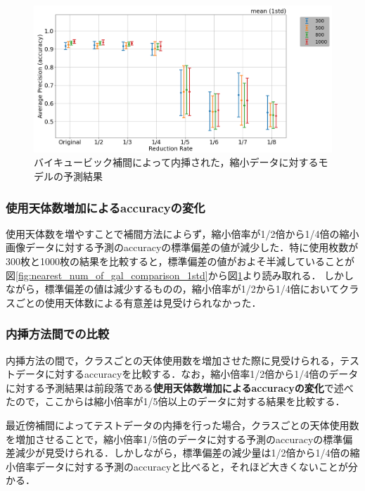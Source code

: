 \documentclass[a4j, 11pt]{jreport}
\begin{document}
\begin{figure}[H]
  \centering
  \includegraphics[width=1.0\hsize, keepaspectratio]{images/5syou/print_errorbar/cubic/acc_with_errorbar_syuron5_cubic_900epoch_30run_num_of_gal_comparison_acc_max_std1sigma.png}
  \caption{バイキュービック補間によって内挿された，縮小データに対するモデルの予測結果}
  \label{fig:cubic_num_of_gal_comparison_1std}
\end{figure}

\subsubsection{使用天体数増加によるaccuracyの変化}
使用天体数を増やすことで補間方法によらず，縮小倍率が1/2倍から1/4倍の縮小画像データに対する予測のaccuracyの標準偏差の値が減少した．特に使用枚数が300枚と1000枚の結果を比較すると，標準偏差の値がおよそ半減していることが図\ref{fig:nearest_num_of_gal_comparison_1std}から図\ref{fig:cubic_num_of_gal_comparison_1std}より読み取れる．
しかしながら，標準偏差の値は減少するものの，縮小倍率が1/2から1/4倍においてクラスごとの使用天体数による有意差は見受けられなかった．


\subsubsection{内挿方法間での比較}
内挿方法の間で，クラスごとの天体使用数を増加させた際に見受けられる，テストデータに対するaccuracyを比較する．なお，縮小倍率1/2倍から1/4倍のデータに対する予測結果は前段落である\textbf{使用天体数増加によるaccuracyの変化}で述べたので，ここからは縮小倍率が1/5倍以上のデータに対する結果を比較する．

最近傍補間によってテストデータの内挿を行った場合，クラスごとの天体使用数を増加させることで，縮小倍率1/5倍のデータに対する予測のaccuracyの標準偏差減少が見受けられる．しかしながら，標準偏差の減少量は1/2倍から1/4倍の縮小倍率データに対する予測のaccuracyと比べると，それほど大きくないことが分かる．
\end{document}
